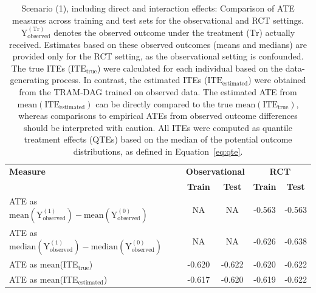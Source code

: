 \begin{table}[htbp]
\centering
\small
\caption{Scenario (1), including direct and interaction effects: Comparison of ATE measures across training and test sets for the observational and RCT settings. $\text{Y}_\text{observed}^{(\text{Tr})}$ denotes the observed outcome under the treatment ($\text{Tr}$) actually received. Estimates based on these observed outcomes (means and medians) are provided only for the RCT setting, as the observational setting is confounded. The true ITEs ($\text{ITE}_\text{true}$) were calculated for each individual based on the data-generating process. In contrast, the estimated ITEs ($\text{ITE}_\text{estimated}$) were obtained from the TRAM-DAG trained on observed data. The estimated ATE from $\text{mean}(\text{ITE}_\text{estimated})$ can be directly compared to the true $\text{mean}(\text{ITE}_\text{true})$, whereas comparisons to empirical ATEs from observed outcome differences should be interpreted with caution. All ITEs were computed as quantile treatment effects (QTEs) based on the median of the potential outcome distributions, as defined in Equation~\ref{eq:qte}.}
\label{tab:scenario1_ate_comparison}
\begin{tabular}{l c c c c}
\toprule
\textbf{Measure} & \multicolumn{2}{c}{\textbf{Observational}} & \multicolumn{2}{c}{\textbf{RCT}} \\
\cmidrule(lr){2-3} \cmidrule(lr){4-5}
 & \textbf{Train} & \textbf{Test} & \textbf{Train} & \textbf{Test} \\
\midrule
ATE as $\text{mean}(\text{Y}_\text{observed}^{(1)}) - \text{mean}(\text{Y}_\text{observed}^{(0)})$ 
& NA & NA 
& -0.563 
& -0.563 \\

ATE as $\text{median}(\text{Y}_\text{observed}^{(1)}) - \text{median}(\text{Y}_\text{observed}^{(0)})$  
& NA & NA 
& -0.626 
& -0.638 \\

ATE as mean(ITE$_\text{true}$)  
& -0.620 
& -0.622 
& -0.620 
& -0.622 \\

ATE as mean(ITE$_\text{estimated}$) 
& -0.617 
& -0.620 
& -0.619 
& -0.622 \\
\bottomrule
\end{tabular}
\end{table}

